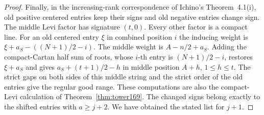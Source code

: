 \documentclass[a4paper,11pt]{article}
\theoremstyle{definition}
\theoremstyle{remark}
\numberwithin{equation}{section}
\begin{document}
\begin{proof}
Finally, in the increasing-rank correspondence of Ichino's
Theorem~4.1(i), old positive centered entries keep their signs
and old negative entries change sign. The middle Levi factor
has signature \((t,0)\). Every other factor is a compact line.
For an old centered entry \(\xi\) in combined position \(i\)
the inducing weight is \(\xi+a_S-((N+1)/2-i)\).
The middle weight is \(A-n/2+a_S\). Adding the compact-Cartan
half sum of roots, whose \(i\)-th entry is \((N+1)/2-i\),
restores \(\xi+a_S\) and gives \(a_S+(t+1)/2-h\) in middle
position \(A+h\), \(1\leq h\leq t\). The strict gaps on both
sides of this middle string and the strict order of the old
entries give the regular good range. These computations are also
the compact-Levi calculation of Theorem~\ref{thm:tower169}.
The changed signs belong exactly to the shifted entries with
\(a\geq j+2\). We have obtained the stated list for \(j+1\).
\end{proof}
\end{document}
